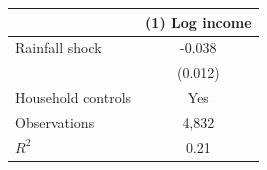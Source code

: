 \begin{tabular}{lc}
\toprule
 & (1) Log income \\
\midrule
Rainfall shock & -0.038 \\
 & (0.012) \\
\midrule
Household controls & Yes \\
Observations & 4,832 \\
$R^2$ & 0.21 \\
\bottomrule
\end{tabular}
